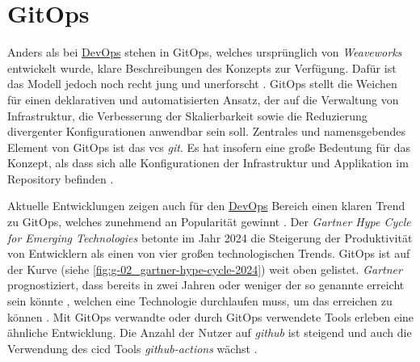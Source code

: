 \section{GitOps}
\label{sec:03-03_gitops}

Anders als bei \hyperref[sec:03-01_devops]{DevOps} stehen in GitOps, welches ursprünglich von \textit{Weaveworks} entwickelt wurde, klare Beschreibungen des Konzepts zur Verfügung. Dafür ist das Modell jedoch noch recht jung und unerforscht \cite{009:GitOps-Evolution-of-DevOps}. GitOps stellt die Weichen für einen deklarativen und automatisierten Ansatz, der auf die Verwaltung von Infrastruktur, die Verbesserung der Skalierbarkeit sowie die Reduzierung divergenter Konfigurationen anwendbar sein soll. Zentrales und namensgebendes Element von GitOps ist das \Gls{vcs} \textit{\Gls{git}}. Es hat insofern eine große Bedeutung für das Konzept, als dass sich alle Konfigurationen der Infrastruktur und Applikation im Repository befinden \cite{024:Investiugating-Impact-of-Containerization-on-Deployment-Process-in-DevOps}.

Aktuelle Entwicklungen zeigen auch für den \hyperref[sec:03-01_devops]{DevOps} Bereich einen klaren Trend zu GitOps, welches zunehmend an Popularität gewinnt \cite{024:Investiugating-Impact-of-Containerization-on-Deployment-Process-in-DevOps}. Der \textit{Gartner Hype Cycle for Emerging Technologies} betonte im Jahr 2024 die Steigerung der Produktivität von Entwicklern als einen von vier großen technologischen Trends. GitOps ist auf der Kurve (siehe \autoref{fig:g-02_gartner-hype-cycle-2024}) weit oben gelistet. \textit{Gartner} prognostiziert, dass bereits in zwei Jahren oder weniger der so genannte  erreicht sein könnte \cite{106:Gartner-2024-Hype-Cycle-for-Emerging-Technologies}, welchen eine Technologie durchlaufen muss, um das  erreichen zu können \cite{108:Gartner-Hype-Cycle}. Mit GitOps verwandte oder durch GitOps verwendete Tools erleben eine ähnliche Entwicklung. Die Anzahl der Nutzer auf \textit{\Gls{github}} ist steigend und auch die Verwendung des \Gls{cicd} Tools \textit{\Gls{github-actions}} wächst \cite{008:GitOps-Approach-to-Cloud-Cluster-System-Deployment}.


